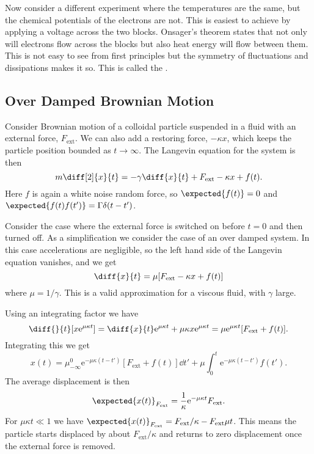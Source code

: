 \documentclass[fleqn]{NotesClass}
\newcommand*{\e}{\mathrm{e}}
\begin{document}
    Now consider a different experiment where the temperatures are the same, but the chemical potentials of the electrons are not.
    This is easiest to achieve by applying a voltage across the two blocks.
    Onsager's theorem states that not only will electrons flow across the blocks but also heat energy will flow between them.
    This is not easy to see from first principles but the symmetry of fluctuations and dissipations makes it so.
    This is called the .
    
    \subsection{Over Damped Brownian Motion}
    Consider Brownian motion of a colloidal particle suspended in a fluid with an external force, \(F_{\mathrm{ext}}\).
    We can also add a restoring force, \(-\kappa x\), which keeps the particle position bounded as \(t \to \infty\).
    The Langevin equation for the system is then
    \begin{equation}
        m\diff[2]{x}{t} = -\gamma\diff{x}{t} + F_{\mathrm{ext}} - \kappa x + f(t).
    \end{equation}
    Here \(f\) is again a white noise random force, so \(\expected{f(t)} = 0\) and \(\expected{f(t)f(t')} = \Gamma \delta(t - t')\).
    
    Consider the case where the external force is switched on before \(t = 0\) and then turned off.
    As a simplification we consider the case of an over damped system.
    In this case accelerations are negligible, so the left hand side of the Langevin equation vanishes, and we get
    \begin{equation}
        \diff{x}{t} = \mu[F_{\mathrm{ext}} - \kappa x + f(t)]
    \end{equation}
    where \(\mu = 1/\gamma\).
    This is a valid approximation for a viscous fluid, with \(\gamma\) large.
    
    Using an integrating factor we have
    \begin{equation}
        \diff{}{t} [x\e^{\mu\kappa t}] = \diff{x}{t}\e^{\mu\kappa t} + \mu\kappa x\e^{\mu\kappa t} = \mu\e^{\mu\kappa t}[F_{\mathrm{ext}} + f(t)].
    \end{equation}
    Integrating this we get
    \begin{equation}
        x(t) = \mu_{-\infty}^{0} \e^{-\mu\kappa(t - t')}[F_{\mathrm{ext}} + f(t)] \dd{t'} + \mu \int_0^t \e^{-\mu\kappa(t - t')}f(t').
    \end{equation}
    The average displacement is then
    \begin{equation}
        \expected{x(t)}_{F_{\mathrm{ext}}} = \frac{1}{\kappa} \e^{-\mu\kappa t}F_{\mathrm{ext}}.
    \end{equation}
    For \(\mu\kappa t \ll 1\) we have \(\expected{x(t)}_{F_{\mathrm{ext}}} = F_{\mathrm{ext}}/\kappa - F_{\mathrm{ext}}\mu t\).
    This means the particle starts displaced by about \(F_{\mathrm{ext}}/\kappa\) and returns to zero displacement once the external force is removed.
    
\end{document}
